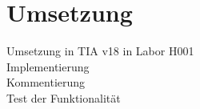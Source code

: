 \chapter*{Umsetzung}
\label{cha:Umsetzung}
Umsetzung in TIA v18 in Labor H001\\
Implementierung\\
Kommentierung\\
Test der Funktionalität

